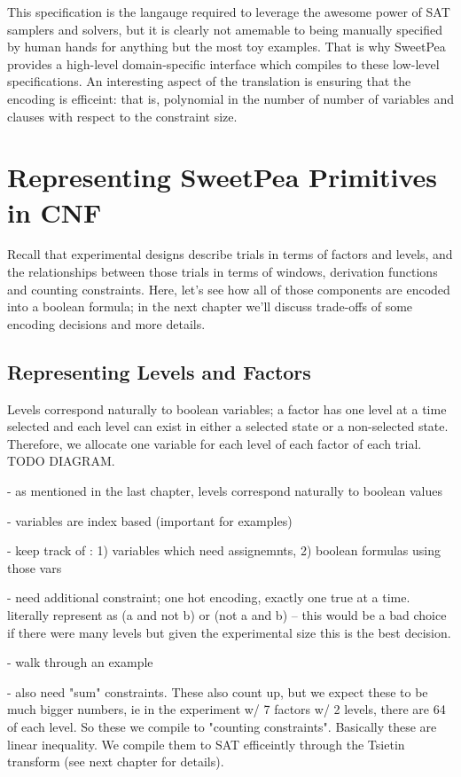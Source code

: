 This specification is the langauge required to leverage the awesome power of SAT samplers and solvers, but it is clearly not amemable to being manually specified by human hands for anything but the most toy examples. That is why SweetPea provides a high-level domain-specific interface which compiles to these low-level specifications. An interesting aspect of the translation is ensuring that the encoding is efficeint: that is, polynomial in the number of number of variables and clauses with respect to the constraint size.

\section{Representing SweetPea Primitives in CNF}

Recall that experimental designs describe trials in terms of factors and levels, and the relationships between those trials in terms of windows, derivation functions and counting constraints. Here, let's see how all of those components are encoded into a boolean formula; in the next chapter we'll discuss trade-offs of some encoding decisions and more details.

\subsection{Representing Levels and Factors}

Levels correspond naturally to boolean variables; a factor has one level at a time selected and each level can exist in either a selected state or a non-selected state. Therefore, we allocate one variable for each level of each factor of each trial. TODO DIAGRAM. 

- as mentioned in the last chapter, levels correspond naturally to boolean values

- variables are index based (important for examples)

- keep track of : 1) variables which need assignemnts, 2) boolean formulas using those vars

- need additional constraint; one hot encoding, exactly one true at a time. literally represent as (a and not b) or (not a and b) -- this would be a bad choice if there were many levels but given the experimental size this is the best decision.

- walk through an example

- also need "sum" constraints. These also count up, but we expect these to be much bigger numbers, ie in the experiment w/ 7 factors w/ 2 levels, there are 64 of each level. So these we compile to "counting constraints". Basically these are linear inequality. We compile them to SAT efficeintly through the Tsietin transform (see next chapter for details).


